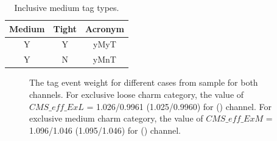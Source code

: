 \begin{itemize}[leftmargin=*]
    \begin{table}
    \caption{Inclusive medium \PQc tag types.}
    \label{tab:extraNPM}
    \begin{center}
    \begin{tabular}{ccc}
    \hline
    \hline
    {\bf{Medium }} & {\bf{Tight }} & {\bf{Acronym}} \\
    \hline
    \hline
     Y & Y & yMyT \\
     Y & N & yMnT \\
    \hline
    \end{tabular}
    \end{center}
    \end{table}

    \begin{figure}
    \centering  
    \vfil
    \caption{The \PQc tag event weight for different cases from \ttjets 
        sample for both channels. For exclusive loose charm category, the value of 
        $CMS\_eff\_ExL$ = 1.026/0.9961 (1.025/0.9960) for \mujets
        (\ejets) channel. For exclusive medium charm category, the value of
        $CMS\_eff\_ExM$ = 1.096/1.046 (1.095/1.046) for \mujets (\ejets) channel.}
    \label{fig:extraNP}
\end{figure}


\end{itemize}
